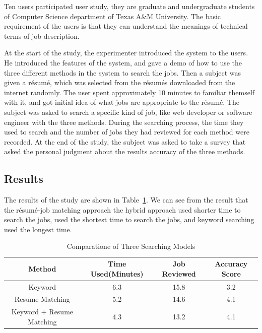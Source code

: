 Ten users participated user study, they are graduate and undergraduate students of Computer Science department of Texas A\&M University. The basic requirement of the users is that they can understand the meanings of technical terms of job description.

At the start of the study, the experimenter introduced the system to the users. He introduced the features of the system, and gave a demo of how to use the three different methods in the system to search the jobs. Then a subject was given a r\'esum\'e, which was selected from the r\'esum\'es downloaded from the internet randomly. The user spent approximately 10 minutes to familiar themself with it, and got initial idea of what jobs are appropriate to the r\'esum\'e. The subject was asked to search a specific kind of job, like web developer or software engineer with the three methods. During the searching process, the time they used to search and the number of jobs they had reviewed for each method were recorded.  At the end of the study, the subject was asked to take a survey that asked  the personal judgment about the results accuracy of the three methods.


\subsection{Results}

The results of the study are shown in Table~\ref{tab:methodcompare}. We can see from the result that the r\'esum\'e-job matching approach the hybrid approach used shorter time to search the jobs, used the shortest time to search the jobs, and keyword searching used the longest time.


\begin{table}[ht]
\caption{Comparatione of Three Searching Models } %
\centering %
\begin{tabular}{  | c | c | c | c | }
 \hline
 Method                    &  Time Used(Minutes)    & Job Reviewed & Accuracy Score  \\
 \hline
 Keyword                   & 6.3                    & 15.8         &       3.2         \\
 \hline
 Resume Matching           & 5.2                    & 14.6         &       4.1         \\
  \hline
 Keyword + Resume Matching & 4.3                    & 13.2         &       4.1       \\
  \hline
\end{tabular}
\label{tab:methodcompare} %
\end{table}


